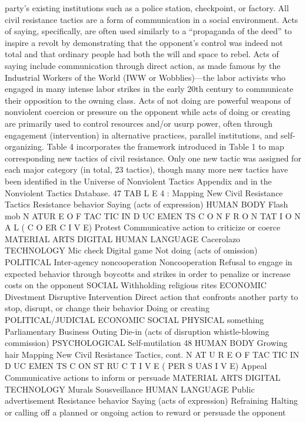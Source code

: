 \documentclass[twoside,a4paper,12pt,fleqn,openany]{extbook}
\begin{document}
party’s existing institutions such as a police station, checkpoint, or factory.
All civil resistance tactics are a form of communication in a social environment. Acts of
saying, specifically, are often used similarly to a “propaganda of the deed” to inspire a revolt
by demonstrating that the opponent’s control was indeed not total and that ordinary people
had both the will and space to rebel. Acts of saying include communication through direct
action, as made famous by the Industrial Workers of the World (IWW or Wobblies)—the labor
activists who engaged in many intense labor strikes in the early 20th century to communicate
their opposition to the owning class. Acts of not doing are powerful weapons of nonviolent
coercion or pressure on the opponent while acts of doing or creating are primarily used to
control resources and/or usurp power, often through engagement (intervention) in alternative
practices, parallel institutions, and self-organizing.
Table 4 incorporates the framework introduced in Table 1 to map corresponding new
tactics of civil resistance. Only one new tactic was assigned for each major category (in total,
23 tactics), though many more new tactics have been identified in the Universe of Nonviolent
Tactics Appendix and in the Nonviolent Tactics Database.
47
TAB L E 4 : Mapping New Civil Resistance Tactics
Resistance
behavior
Saying
(acts of
expression)
HUMAN BODY
Flash mob
N ATUR E O F TAC TIC IN D UC EMEN TS
C O N F R O N TAT I O N A L ( C O ER C I V E)
Protest
Communicative action to criticize or coerce
MATERIAL ARTS
 DIGITAL
 HUMAN LANGUAGE
Cacerolazo
 TECHNOLOGY
 Mic check
Digital game
Not doing
(acts of
omission)
POLITICAL
Inter-agency
noncooperation
Noncooperation
Refusal to engage in expected behavior through boycotts and strikes
in order to penalize or increase costs on the opponent
SOCIAL
Withholding
religious rites
ECONOMIC
Divestment
Disruptive Intervention
Direct action that confronts another party to stop,
disrupt, or change their behavior
Doing
or creating
 POLITICAL/JUDICIAL
 ECONOMIC
 SOCIAL
 PHYSICAL
something
Parliamentary
 Business
 Outing
 Die-in
(acts of
disruption
 whistle-blowing
commission)
PSYCHOLOGICAL
Self-mutilation
48
HUMAN BODY
Growing hair
Mapping New Civil Resistance Tactics, cont.
N AT U R E O F TAC TIC IN D UC EMEN TS
C ON ST RU C T I V E ( PER S UAS I V E)
Appeal
Communicative actions to inform or persuade
MATERIAL ARTS
 DIGITAL
TECHNOLOGY
Murals
Sousveillance
HUMAN
LANGUAGE
Public
advertisement
Resistance
behavior
Saying
(acts of
expression)
Refraining
Halting or calling off a planned or ongoing action
to reward or persuade the opponent
\end{document}
